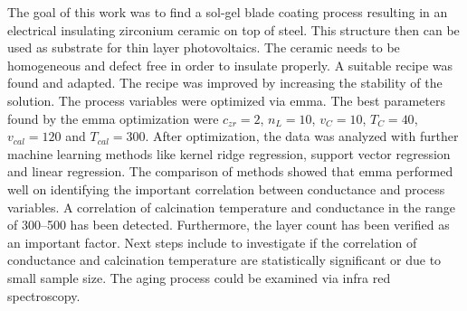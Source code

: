 The goal of this work was to find a sol-gel blade coating process resulting in an electrical insulating zirconium ceramic on top of steel.
This structure then can be used as substrate for thin layer photovoltaics. 
The ceramic needs to be homogeneous and defect free in order to insulate properly.
A suitable recipe was found\cite{Hu2016} and adapted. 
The recipe was improved by increasing the stability of the solution. 
The process variables were optimized via \gls{emma}. 
The best parameters found by the \gls{emma} optimization were 
$c_{zr}=2$, $n_L=10$, $v_{C}=10$, $T_{C}=40$, $v_{cal}=120$ and $T_{cal}=300$.
After optimization, the data was analyzed with further machine learning methods like kernel ridge regression, support vector regression and linear regression. 
The comparison of methods showed that \gls{emma} performed well on identifying the important correlation between conductance and process variables. 
A correlation of calcination temperature and conductance in the range of 300--500\oc{} has been detected.
Furthermore, the layer count has been verified as an important factor. 
Next steps include to investigate if the correlation of conductance and calcination temperature are statistically significant or due to small sample size. 
The aging process could be examined via infra red spectroscopy. 
\iffalse
was kann noch veraendert werden? 
humidity 
solution age
vdb and tdb on g and phd 
Tcal on g and phd 

Making of the solution for the sol-gel process:
For a single concentrated solution \ml{0.05} of \gls{zrpro} are added while stirring to \ml{4.95} of \gls{buoh} and stirred for \minutes{15}. 
\ml{0.013} (or one molar equvilent of Zr) of \gls{acac} is added to the stirring solution. 
After another \minutes{15} \ml{1} of acetic acid is added and stirred for \minutes{30} to stabilize the solution up to \h{24}. 

The concentration can be increased up to 5 times being stable for a minimum of \h{4}. 
The sol-gel process produces am homogeneous transparent crystalline zirconia oxide layer. 
homogeneity can be mainly controlled via blade velocity and temperature and layers can be stacked.

It should have been also verglichen with grid search with comparable size
but most time was used to find a vernuenfig base recipe and process

It is still very human 
Der process is - as it the case with all ML and most fitting processes - is very abhaengig von hyper parameters, 
In the current work population size, number of generations, and most importantly boundaries (grenzen). 
\fi

